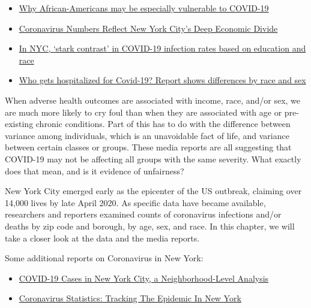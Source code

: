 \documentclass[
  openany]{book}
\providecommand{\tightlist}{%
  \setlength{\itemsep}{0pt}\setlength{\parskip}{0pt}}
\begin{document}
\begin{itemize}
\item
  \href{https://www.sciencenews.org/article/coronavirus-why-african-americans-vulnerable-covid-19-health-race}{Why African-Americans may be especially vulnerable to COVID-19}
\item
  \href{https://theintercept.com/2020/04/09/nyc-coronavirus-deaths-race-economic-divide/}{Coronavirus Numbers Reflect New York City's Deep Economic Divide}
\item
  \href{https://abcnews.go.com/Health/nyc-stark-contrast-covid-19-infection-rates-based/story?id=69920706}{In NYC, `stark contrast' in COVID-19 infection rates based on education and race}
\item
  \href{https://www.statnews.com/2020/04/09/hospitalized-covid-19-patients-differences-by-race-and-sex/}{Who gets hospitalized for Covid-19? Report shows differences by race and sex}
\end{itemize}

When adverse health outcomes are associated with income, race, and/or sex, we are much more likely to cry foul than when they are associated with age or pre-existing chronic conditions. Part of this has to do with the difference between variance among individuals, which is an unavoidable fact of life, and variance between certain classes or groups. These media reports are all suggesting that COVID-19 may not be affecting all groups with the same severity. What exactly does that mean, and is it evidence of unfairness?

New York City emerged early as the epicenter of the US outbreak, claiming over 14,000 lives by late April 2020. As specific data have became available, researchers and reporters examined counts of coronavirus infections and/or deaths by zip code and borough, by age, sex, and race. In this chapter, we will take a closer look at the data and the media reports.

Some additional reports on Coronavirus in New York:

\begin{itemize}
\tightlist
\item
  \href{https://furmancenter.org/thestoop/entry/covid-19-cases-in-new-york-city-a-neighborhood-level-analysis}{COVID-19 Cases in New York City, a Neighborhood-Level Analysis}
\item
  \href{https://gothamist.com/news/coronavirus-statistics-tracking-epidemic-new-york}{Coronavirus Statistics: Tracking The Epidemic In New York}
\end{itemize}
\end{document}
